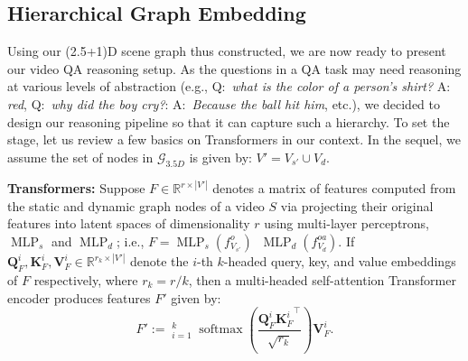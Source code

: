 \documentclass[letterpaper]{article} \usepackage{aaai22}  \usepackage{times}  \usepackage{helvet}  \usepackage{courier}  \usepackage[hyphens]{url}  \usepackage{graphicx} \urlstyle{rm} \def\UrlFont{\rm}  \usepackage{natbib}  \usepackage{caption} \DeclareCaptionStyle{ruled}{labelfont=normalfont,labelsep=colon,strut=off} \frenchspacing  \setlength{\pdfpagewidth}{8.5in}  \setlength{\pdfpageheight}{11in}  \usepackage{algorithm}
\newcommand{\V}{{S}}
\newcommand{\f}{f}
\newcommand{\fo}{f^o}
\newcommand{\graph}{\mathcal{G}}
\newcommand{\gtf}{\graph_{3.5D}}
\newcommand{\feat}{F}
\newcommand{\query}{\mathbf{Q}}
\newcommand{\key}{\mathbf{K}}
\newcommand{\val}{\mathbf{V}}
\DeclareMathOperator*{\softmax}{softmax}
\DeclareMathOperator*{\concat}{||}
\DeclareMathOperator*{\MLP}{MLP}
\newcommand{\name}{(2.5+1)D\xspace}
\newcommand{\nodes}{V}
\newcommand{\reals}[1]{\mathbb{R}^{#1}}
\begin{document}
\subsection{Hierarchical Graph Embedding}
Using our \name scene graph thus constructed, we are now ready to present our video QA reasoning setup. As the questions in a QA task may need reasoning at various levels of abstraction (e.g., Q:~\emph{what is the color of a person's shirt?} A: \emph{red}, Q:~\emph{why did the boy cry?}: A:~\emph{Because the ball hit him}, etc.), we decided to design our reasoning pipeline so that it can capture such a hierarchy. To set the stage, let us review a few basics on Transformers in our context. In the sequel, we assume the set of nodes in $\gtf$ is given by: $\nodes'=\nodes_{s'}\cup \nodes_d$.

\noindent\textbf{Transformers:} Suppose $\feat\in \reals{r\times |\nodes'|}$ denotes a matrix of features computed from the static and dynamic graph nodes of a video $\V$ via projecting their original features into latent spaces of dimensionality $r$ using multi-layer perceptrons, $\MLP_s$ and $\MLP_d$; i.e., $\feat=\MLP_s(\fo_{\nodes_{s'}}) \concat \MLP_d(\f^{oa}_{\nodes_d})$. If $\query^i_F, \key^i_F, \val^i_F\in\reals{r_k\times |\nodes'|}$ denote the $i$-th $k$-headed query, key, and value embeddings of $\feat$ respectively, where $r_k=r/k$, then a multi-headed self-attention Transformer encoder produces features $\feat'$ given by:
\begin{equation}
   \feat' := \concat_{i=1}^k \softmax\left(\frac{\query^i_F {\key^i_F}^{\top}}{\sqrt{r_k}}\right) \val^i_F.
   \label{eq:2}
\end{equation}
\end{document}
